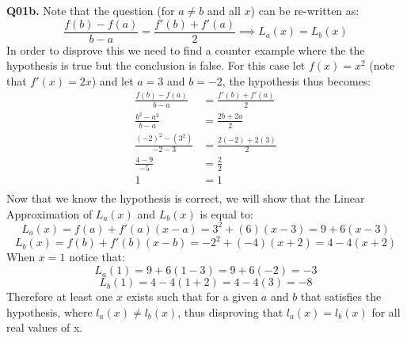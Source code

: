 \documentclass[11pt]{article}
\begin{document}
\textbf{Q01b.} Note that the question (for $a \neq b$ and all $x$) can be re-written as:
\[ \frac{f(b)-f(a)}{b-a} = \frac{f'(b)+f'(a)}{2}  \implies L_a(x) = L_b(x) \]
In order to disprove this we need to find a counter example where the the hypothesis is true but the conclusion is false. For this case let $f(x)=x^2$ (note that $f'(x) = 2x$) and let $a=3$ and $b=-2$, the hypothesis thus becomes:
\begin{align*}
\frac{f(b)-f(a)}{b-a} &= \frac{f'(b)+f'(a)}{2}\\
\frac{b^2-a^2}{b-a} &= \frac{2b+2a}{2}\\
\frac{(-2)^2-(3^2)}{-2-3} &= \frac{2(-2)+2(3)}{2}\\
\frac{4-9}{-5} &= \frac{2}{2}\\
1 &= 1\\
\end{align*}
Now that we know the hypothesis is correct, we will show that the Linear Approximation of $L_a(x)$ and $L_b(x)$ is equal to:
\[ L_a(x) =f(a)+f'(a)(x-a) = 3^2 + (6)(x-3) = 9 + 6(x-3) \]
\[ L_b(x) =f(b)+f'(b)(x-b) = -2^2 + (-4)(x+2) = 4  - 4(x+2) \]
When $x =1$ notice that:
\[ L_a(1) = 9 + 6(1-3) = 9+6(-2) = -3 \]
\[ L_b(1) = 4  - 4(1+2) = 4 - 4(3) = -8 \]
Therefore at least one $x$ exists such that for a given $a$ and $b$ that satisfies the hypothesis, where $l_a(x) \neq l_b(x)$, thus disproving that $l_a(x) = l_b(x)$ for all real values of x.
\end{document}
